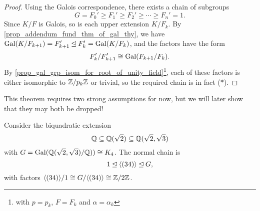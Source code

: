 \begin{proof}
    Using the Galois correspondence, there exists a chain of subgroups
    \[
        G = F_0' \geq F_1' \geq F_2' \geq \cdots \geq F_n' = 1. \tag{$*$}
    \]
    Since $K/F$ is Galois, so is each upper extension $K/F_k$. By \cref{prop_addendum_fund_thm_of_gal_thy}, we have $\operatorname{Gal}(K/F_{k + 1}) = F_{k + 1}' \unlhd F_k' = \operatorname{Gal}(K/F_k)$, and the factors have the form
    \[
        F_k'/F_{k + 1}' \cong \operatorname{Gal}(F_{k + 1}/F_k).
    \]
    By \cref{prop_gal_grp_isom_for_root_of_unity_field}\footnote{with $p = p_k$, $F = F_k$ and $\alpha = \alpha_k$}, each of these factors is either isomorphic to $\mathbb{{Z}}/{{p_k}}\mathbb{{Z}}$ or trivial, so the required chain is in fact ($*$).
\end{proof}

\begin{remark}
    This theorem requires two strong assumptions for now, but we will later show that they may both be dropped!
\end{remark}

\begin{example}
    Consider the biquadratic extension
    \[
        \mathbb{{Q}} \subseteq \mathbb{{Q}}(\sqrt{2}) \subseteq \mathbb{{Q}}(\sqrt{2}, \sqrt{3})
    \]
    with $G = \operatorname{Gal}(\mathbb{{Q}}(\sqrt{2}, \sqrt{3})/\mathbb{{Q}})) \cong K_4$. The normal chain is
    \[
        1 \unlhd \langle {(34)} \rangle \unlhd G,
    \]
    with factors $\langle {(34)} \rangle/1 \cong G/\langle {(34)} \rangle \cong \mathbb{{Z}}/{{2}}\mathbb{{Z}}$.
\end{example}
